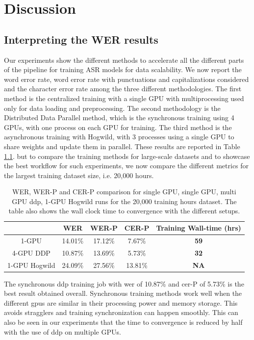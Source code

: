 \chapter{Discussion}
\label{chapter:discussion}

\section{Interpreting the WER results}
Our experiments show the different methods to accelerate all the different parts of the pipeline for training ASR models for data scalability. We now report the word error rate, word error rate with punctuations and capitalizations considered and the character error rate among the three different methodologies. The first method is the centralized training with a single GPU with multiprocessing used only for data loading and preprocessing. The second methodology is the Distributed Data Parallel method, which is the synchronous training using 4 GPUs, with one process on each GPU for training. The third method is the asynchronous training with Hogwild, with 3 processes using a single GPU to share weights and update them in parallel. These results are reported in Table \ref{table:overall_wer}. but to compare the training methods for large-scale datasets and to showcase the best workflow for such experiments, we now compare the different metrics for the largest training dataset size, i.e. 20,000 hours. 
\begin{table}[ht]
\centering
\begin{tabular}{c | c c c | c }
\hline
     & WER & WER-P & CER-P & Training Wall-time (hrs)\\
 \hline
  1-GPU & 14.01\% & 17.12\% & 7.67\% & \textbf{59} \\
  4-GPU DDP & 10.87\% & 13.69\% & 5.73\% & \textbf{32} \\
  1-GPU Hogwild & 24.09\% & 27.56\% & 13.81\% & \textbf{NA} \\
 \hline
\end{tabular}
\caption{\label{table:overall_wer} WER, WER-P and CER-P comparison for single GPU, single GPU, multi GPU \acrshort{ddp}, 1-GPU Hogwild runs for the 20,000 training hours dataset. The table also shows the wall clock time to convergence with the different setups.}
\end{table}

The synchronous \acrshort{ddp} training job with \acrshort{wer} of 10.87\% and \acrshort{cer}-P of 5.73\% is the best result obtained overall. Synchronous training methods work well when the different \acrshort{gpu}s are similar in their processing power and memory storage. This avoids stragglers and training synchronization can happen smoothly. This can also be seen in our experiments that the time to convergence is reduced by half with the use of \acrshort{ddp} on multiple GPUs. 

